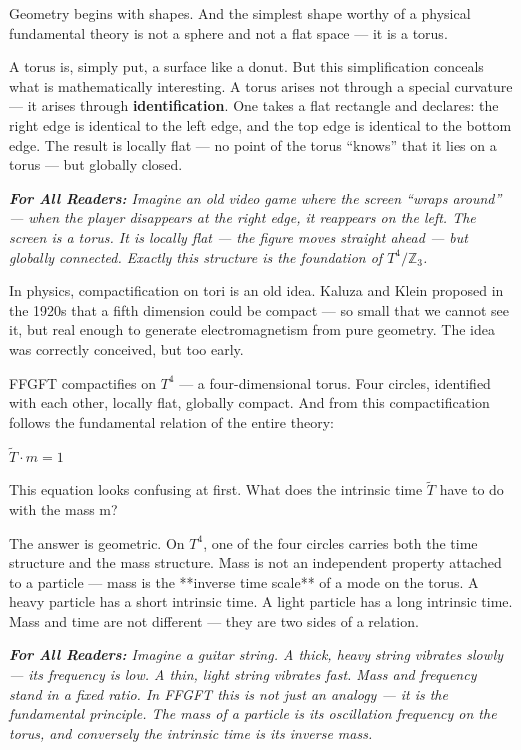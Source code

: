 \documentclass[11pt,oneside]{book}
\newenvironment{laierspur}{%
  \par\vspace{4pt}%
  \noindent\small\itshape\color{blue!60!black}%
  \textbf{For All Readers:}\enspace\ignorespaces}{%
  \par\vspace{4pt}\normalsize\normalfont\normalcolor}
\begin{document}
Geometry begins with shapes. And the simplest shape worthy of a physical
fundamental theory is not a sphere and not a flat space — it is a torus.

A torus is, simply put, a surface like a donut. But this simplification
conceals what is mathematically interesting. A torus arises not through a
special curvature — it arises through \textbf{identification}. One takes a flat
rectangle and declares: the right edge is identical to the left edge, and
the top edge is identical to the bottom edge. The result is locally flat —
no point of the torus \enquote{knows} that it lies on a torus — but globally closed.

\begin{laierspur}
Imagine an old video game where the screen \enquote{wraps around} — when the
player disappears at the right edge, it reappears on the left. The screen is
a torus. It is locally flat — the figure moves straight ahead — but globally
connected. Exactly this structure is the foundation of $T^4/\mathbb{Z}_3$.
\end{laierspur}

In physics, compactification on tori is an old idea. Kaluza and Klein
proposed in the 1920s that a fifth dimension could be compact — so small
that we cannot see it, but real enough to generate electromagnetism from
pure geometry. The idea was correctly conceived, but too early.

FFGFT compactifies on $T^4$ — a four-dimensional torus. Four circles,
identified with each other, locally flat, globally compact. And from this
compactification follows the fundamental relation of the entire theory:

\textbf{$\tilde{T}\cdot m = 1$}

This equation looks confusing at first. What does the intrinsic time
$\tilde{T}$ have to do with the mass m?

The answer is geometric. On $T^4$, one of the four circles carries both the
time structure and the mass structure. Mass is not an independent property
attached to a particle — mass is the **inverse time scale** of a mode on the
torus. A heavy particle has a short intrinsic time. A light particle has a
long intrinsic time. Mass and time are not different — they are two sides of
a relation.

\begin{laierspur}
Imagine a guitar string. A thick, heavy string vibrates slowly — its
frequency is low. A thin, light string vibrates fast. Mass and frequency
stand in a fixed ratio. In FFGFT this is not just an analogy — it is the
fundamental principle. The mass of a particle is its oscillation frequency
on the torus, and conversely the intrinsic time is its inverse mass.
\end{laierspur}
\end{document}
